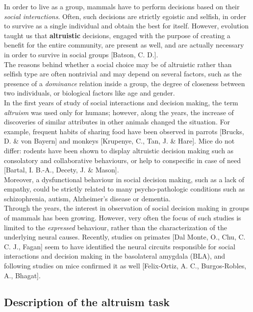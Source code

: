 \documentclass[12pt, a4paper]{article}
\begin{document}
In order to live as a group, mammals have to perform decisions based on their \textit{social interactions}. Often, such decisions are strictly egoistic and selfish, in order to survive as a single individual and obtain the best for itself. However, evolution taught us that \textbf{altruistic} decisions, engaged with the purpose of creating a benefit for the entire community, are present as well, and are actually necessary in order to survive in social groups [Batson, C. D.].\\
The reasons behind whether a social choice may be of altruistic rather than selfish type are often nontrivial and may depend on several factors, such as the presence of a \textit{dominance} relation inside a group, the degree of closeness between two individuals, or biological factors like age and gender.\\
In the first years of study of social interactions and decision making, the term \textit{altruism} was used only for humans; however, along the years, the increase of discoveries of similar attributes in other animals changed the situation. For example, frequent habits of sharing food have been observed in parrots [Brucks, D. \& von Bayern] and monkeys [Krupenye, C., Tan, J. \& Hare]. Mice do not differ: rodents have been shown to display altruistic decision making such as consolatory and collaborative behaviours, or help to conspecific in case of need [Bartal, I. B.-A., Decety, J. \& Mason]. \\
Moreover, a dysfunctional behaviour in social decision making, such as a lack of empathy, could be strictly related to many psycho-pathologic conditions such as schizophrenia, autism, Alzheimer's disease or dementia. \\
Through the years, the interest in observation of social decision making in groups of mammals has been growing. However, very often the focus of such studies is limited to the \textit{expressed} behaviour, rather than the characterization of the underlying neural causes. Recently, studies on primates [Dal Monte, O., Chu, C. C. J., Fagan] seem to have identified the neural circuits responsible for social interactions and decision making in the basolateral amygdala (BLA), and following studies on mice confirmed it as well [Felix-Ortiz, A. C., Burgos-Robles, A., Bhagat].

\subsection{Description of the altruism task}
\end{document}

